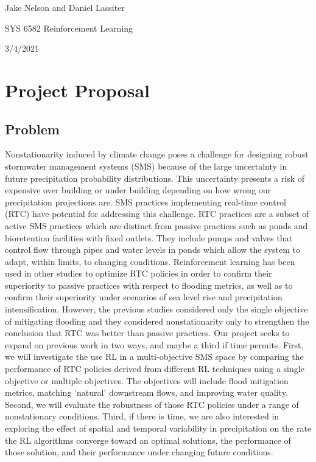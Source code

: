 \documentclass[11pt,a4paper]{article}
\begin{document}
Jake Nelson and Daniel Lassiter

SYS 6582 Reinforcement Learning

3/4/2021

\section*{Project Proposal}


\subsection*{Problem}
Nonstationarity induced by climate change poses a challenge for designing robust stormwater management systems (SMS) because of the large uncertainty in future precipitation probability distributions. This uncertainty presents a risk of expensive over building or under building depending on how wrong our precipitation projections are. SMS practices implementing real-time control (RTC) have potential for addressing this challenge. RTC practices are a subset of active SMS practices which are distinct from passive practices such as ponds and bioretention facilities with fixed outlets. They include pumps and valves that control flow through pipes and water levels in ponds which allow the system to adapt, within limits, to changing conditions. Reinforcement learning has been used in other studies to optimize RTC policies in order to confirm their superiority to passive practices with respect to flooding metrics, as well as to confirm their superiority under scenarios of sea level rise and precipitation intensification. However, the previous studies considered only the single objective of mitigating flooding and they considered nonstationarity only to strengthen the conclusion that RTC was better than passive practices. Our project seeks to expand on previous work in two ways, and maybe a third if time permits. First, we will investigate the use RL in a multi-objective SMS space by comparing the performance of RTC policies derived from different RL techniques using a single objective or multiple objectives. The objectives will include flood mitigation metrics, matching 'natural' downstream flows, and improving water quality. Second, we will evaluate the robustness of those RTC policies under a range of nonstationary conditions. Third, if there is time, we are also interested in exploring the effect of spatial and temporal variability in precipitation on the rate the RL algorithms converge toward an optimal solutions, the performance of those solution, and their performance under changing future conditions.
\end{document}
